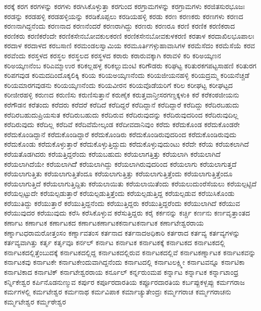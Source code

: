 {ಕರಕ್ಕೆ
ಕರಗ
ಕರಗಳನ್ನು
ಕರಗಳು
ಕರಗಿಸಿಕೊಳ್ಳುತ್ತಾ
ಕರಗುಂದ
ಕರಗ್ರಾಮಗಳನ್ನು
ಕರಗ್ರಾಮಗಳು
ಕರಜಿತಸುರಭೂಜಃ
ಕರಡನ್ನು
ಕರಡಹಳ್ಳಿ
ಕರಡಹಳ್ಳಿಯನ್ನು
ಕರಡಿಕೊಪ್ಪಲು
ಕರಡಿಯಹಳ್ಳಿ
ಕರಡು
ಕರಣ
ಕರಣಕರು
ಕರಣಗಳು
ಕರಣದ
ಕರಣನಾಗಿದ್ದನೆಂದು
ಕರಣನಾದ
ಕರಣನೆಂದರೆ
ಕರಣರಾಗಿದ್ದು
ಕರಣರು
ಕರಣರೂ
ಕರಣಿ
ಕರಣಿಕ
ಕರಣಿಕರಾದ
ಕರಣಿಕರು
ಕರಣಿಕರೆಂದೇ
ಕರಣಿಕಸೇನಬೋವಕುಲಕರಣಿ
ಕರಣಿಕಸೇನಬೋವಕುಳಕರಣಿ
ಕರತಾಳ
ಕರದಾಖಿಲಭೂಪಾಲಃ
ಕರದಾಳ
ಕರದಾಳದ
ಕರಬಸಾಣಿ
ಕರಮಂಡಲಸ್ವಾಮಿಯ
ಕರಮೂರ್ತಿಗಳ್ಗುಹಾವಾಸಿಗಳ
ಕರಮೆಸೆದಂ
ಕರಮೆಸೆಯೆ
ಕರವ
ಕರವೆಂದು
ಕರಸ್ತಳದ
ಕರಸ್ಥಲ
ಕರಸ್ಥಲದ
ಕರಸ್ಥಳದ
ಕರಾರು
ಕರಾರುವಕ್ಕಾಗಿ
ಕರಾವಳಿ
ಕರಿ
ಕರಿಅಯ್ಕಣನ
ಕರಿಅಯ್ಕಣನೆಂಬ
ಕರಿಎಮ್ಮಾಉರ
ಕರಿಕಲ್ಲಹಳ್ಳ
ಕರಿಕಲ್ಲುಮಂಟಿ
ಕರಿಗೌಡರು
ಕರಿಘಟ್ಟ
ಕರಿತುರಕಗಪಟ್ಟಸಾಹಣಿ
ಕರಿತುರಗ
ಕರಿಪಗವುಡ
ಕರಿಮದದಿಂದೊಕ್ಕಲಿಕ್ಕಿ
ಕರಿಯ
ಕರಿಯಅಯ್ಕಣನೆಂದು
ಕರಿಯಜೀಯನಹಳ್ಳಿ
ಕರಿಯದ್ರಮ್ಮ
ಕರಿಯನೆಚ್ಚಡೆ
ಕರಿಯಮಾರಗವುಡನು
ಕರಿಯಯ್ಕಣನೆಂದು
ಕರಿಯವೀರನ
ಕರಿಯವೊಡೆಯರಿಗೆ
ಕರಿಲ
ಕರೀಘಟ್ಟ
ಕರೀಘಟ್ಟದ
ಕರೀಜೀರಹಳ್ಳಿ
ಕರುಣದ
ಕರುಣಿಸು
ಕರುಣಿಸುತ್ತಾನೆ
ಕರುಣೈಕ
ಕರುತ್ತವಾನ್ತೀಸರಗಣ್ಡಕ್ಕಳುಕಿ
ಕರೆ
ಕರೆಕಂಠಜೀಯನು
ಕರೆಗೌಡನ
ಕರೆತಂದು
ಕರೆದರು
ಕರೆದರೆ
ಕರೆದಿದೆ
ಕರೆದಿದ್ದರೆ
ಕರೆದಿದ್ದಾನೆ
ಕರೆದಿದ್ದಾರೆ
ಕರೆದಿದ್ದು
ಕರೆದಿರಬಹುದು
ಕರೆದಿರಬಹುದುಪ್ರಿಯಸುತ
ಕರೆದಿರುಬಹುದು
ಕರೆದಿರುವ
ಕರೆದಿರುವುದನ್ನು
ಕರೆದಿರುವುದರಿಂದ
ಕರೆದಿರುವುದಿಲ್ಲ
ಕರೆದಿರುವುದು
ಕರೆದಿಲ್ಲ
ಕರೆದಿವೆ
ಕರೆದಿವೆಮೇಲ್ಕಂಡ
ಕರೆದೀವದಾನಿವುಂ
ಕರೆದು
ಕರೆದುಕೊಂಡ
ಕರೆದುಕೊಂಡರೇ
ಕರೆದುಕೊಂಡಿದ್ದಾನೆ
ಕರೆದುಕೊಂಡಿದ್ದಾರೆ
ಕರೆದುಕೊಂಡಿರು
ಕರೆದುಕೊಂಡಿರುವುದರಿಂದ
ಕರೆದುಕೊಂಡಿರುವುದು
ಕರೆದುಕೊಂಡು
ಕರೆದುಕೊಳ್ಳುತ್ತಾರೆ
ಕರೆದುಕೊಳ್ಳುತ್ತಿದ್ದುದು
ಕರೆದುಕೊಳ್ಳುವುದುಂಟು
ಕರೆದೇ
ಕರೆಯ
ಕರೆಯಕಲಾಗಿದೆ
ಕರೆಯತೊಡಗಿದರು
ಕರೆಯತ್ತಿದ್ದರೆಂದು
ಕರೆಯಬಹುದು
ಕರೆಯಲಾಗತ್ತಿತ್ತು
ಕರೆಯಲಾಗಿ
ಕರೆಯಲಾಗಿದೆ
ಕರೆಯಲಾಗಿದೆಯೇ
ಕರೆಯಲಾಗಿದೆೆ
ಕರೆಯಲಾಗಿದ್ದು
ಕರೆಯಲಾಗಿರುವುದರಿಂದ
ಕರೆಯಲಾಗು
ಕರೆಯಲಾಗುತ್ತದೆ
ಕರೆಯಲಾಗುತ್ತಿತು
ಕರೆಯಲಾಗುತ್ತಿತೆಂದೂ
ಕರೆಯಲಾಗುತ್ತಿತ್ತು
ಕರೆಯಲಾಗುತ್ತಿತ್ತೆಂದು
ಕರೆಯಲಾಗುತ್ತಿತ್ತೆಂದೂ
ಕರೆಯಲಾಗುತ್ತಿದೆ
ಕರೆಯಲಾಗುತ್ತಿದ್ದಿತು
ಕರೆಯಲಾಯಿತು
ಕರೆಯಲಾಯಿತೆಂದು
ಕರೆಯಲುದುಂರೆಸೆಯಲು
ಕರೆಯಲ್ಪಟ್ಟಿದೆ
ಕರೆಯಲ್ಪಟ್ಟುದೇ
ಕರೆಯಲ್ಪಡುತ್ತಾರೆ
ಕರೆಯಲ್ಪಡುತ್ತಿತ್ತೆಂದು
ಕರೆಯಲ್ಪಡುತ್ತಿದ್ದ
ಕರೆಯಲ್ಪಡುವ
ಕರೆಯಿಸಿಕೊಂಡು
ಕರೆಯುತಿದ್ದು
ಕರೆಯುತ್ತಾರೆ
ಕರೆಯುತ್ತಿದ್ದನೆಂದು
ಕರೆಯುತ್ತಿದ್ದರು
ಕರೆಯುತ್ತಿದ್ದರೆಂದು
ಕರೆಯುಲಾಗಿದೆ
ಕರೆಯುವ
ಕರೆಯುವುದರ
ಕರೆಯುವುದು
ಕರೆಸಿ
ಕರೆಸಿಕೊಳ್ಳುವ
ಕರೆಸುತ್ತಿದ್ದರು
ಕರೈ
ಕರ್ಕನನ್ನು
ಕರ್ಚ್ಚಿ
ಕರ್ಣನು
ಕರ್ಣವೃತ್ತಾಂತದ
ಕರ್ಣಾಟ
ಕರ್ಣಾಟಕ
ಕರ್ಣಾಟಕದ
ಕರ್ಣಾಟಕರ್ಣಾಟಕಕರ್ನಾಟಕರ್ನಾಟಕ
ಕರ್ಣಾಟೇಶ್ವರರಾಯ
ಕರ್ಣ್ನಾಟಧರಾಮರೋತ್ತಂಸಂ
ಕರ್ಣ್ನಾವತಂಸ
ಕರ್ತನಾದ
ಕರ್ತನಾದಅಧಿಕಾರಿ
ಕರ್ತರಾದ
ಕರ್ತವ್ಯ
ಕರ್ತವ್ಯಗಳನ್ನು
ಕರ್ತವ್ಯವಾಗಿತ್ತು
ಕರ್ತೃ
ಕರ್ತೃವೂ
ಕರ್ನಲ್
ಕರ್ನಾಟ
ಕರ್ನಾಟಕ
ಕರ್ನಾಟಕಕ್ಕೆ
ಕರ್ನಾಟಕದ
ಕರ್ನಾಟಕದಲ್ಲಿ
ಕರ್ನಾಟಕದಲ್ಲಿತ್ತೆಂಬುದಕ್ಕೆ
ಕರ್ನಾಟಕದಲ್ಲಿದ್ದ
ಕರ್ನಾಟಕದಲ್ಲಿರುವ
ಕರ್ನಾಟಕದಲ್ಲಿವೆ
ಕರ್ನಾಟಕರ್ಣ್ನಾಟಕ
ಕರ್ನಾಟಕವನ್ನು
ಕರ್ನಾಟಕವು
ಕರ್ನಾಟಕೇ
ಕರ್ನಾಟಕೇಂದುವಾಗಿದ್ದನೆಂದು
ಕರ್ನಾಟದಲ್ಲಿ
ಕರ್ನಾಟಲಕ್ಷ್ಮೀ
ಕರ್ನಾಟವನ್ನೂ
ಕರ್ನಾಟಿಕಾ
ಕರ್ನಾಟಿಕಾದ
ಕರ್ನಾಟಿಕ್
ಕರ್ನಾಟೇಶ್ವರರಾಯ
ಕರ್ನೂಲ್
ಕರ್ನ್ನರುಂಮಪ
ಕರ್ನ್ನಾಟ
ಕರ್ನ್ನಾಟಕ
ಕರ್ನ್ನಾಟಾಂಧ್ರ
ಕರ್ನ್ನಿಕೇಶ್ವರ
ಕರ್ಪಿನೊಡನುಣ್ಮುವ
ಕರ್ಪುರ
ಕರ್ಪೂರದಾರತಿಯ
ಕರ್ಪ್ಪೂರದಾರತಿಯ
ಕರ್ಬಪ್ಪುಕಳ್ಬಪ್ಪು
ಕರ್ಮಗರಾಜ
ಕರ್ಮಗಳಲ್ಲಿ
ಕರ್ಮಟೇಶ್ವರ
ಕರ್ಮನಾಥ
ಕರ್ಮವಿಪಾಕ
ಕರ್ಮಾಚ್ಯುತೇಂದ್ರಃ
ಕರ್ಮ್ಮಗರಾಚ
ಕರ್ಮ್ಮಗರಾಚನು
ಕರ್ಮ್ಮಟೇಶ್ವರ
ಕರ್ಮ್ಮಠೇಶ್ವರ
}
